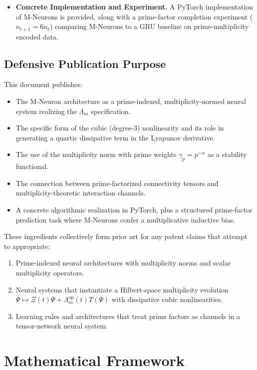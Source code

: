 \documentclass[11pt]{article}
\begin{document}
\begin{itemize}[leftmargin=*]
  \item \textbf{Concrete Implementation and Experiment.}
  A PyTorch implementation of M-Neurons is provided, along with a prime-factor completion experiment (\(n_{t+1}=6n_t\)) comparing M-Neurons to a GRU baseline on prime-multiplicity encoded data.
\end{itemize}

\subsection{Defensive Publication Purpose}

This document publishes:

\begin{itemize}[leftmargin=*]
  \item The M-Neuron architecture as a prime-indexed, multiplicity-normed neural system realizing the \(\Lambda_m\) specification.
  \item The specific form of the cubic (degree-3) nonlinearity and its role in generating a quartic dissipative term in the Lyapunov derivative.
  \item The use of the multiplicity norm with prime weights \(\gamma_p=p^{-\alpha}\) as a stability functional.
  \item The connection between prime-factorized connectivity tensors and multiplicity-theoretic interaction channels.
  \item A concrete algorithmic realization in PyTorch, plus a structured prime-factor prediction task where M-Neurons confer a multiplicative inductive bias.
\end{itemize}

These ingredients collectively form prior art for any patent claims that attempt to appropriate:

\begin{enumerate}[leftmargin=*]
  \item Prime-indexed neural architectures with multiplicity norms and scalar multiplicity operators.
  \item Neural systems that instantiate a Hilbert-space multiplicity evolution \(\Psi \mapsto \Xi(t)\Psi + \Lambda^{\mathrm{op}}_m(t)T(\Psi)\) with dissipative cubic nonlinearities.
  \item Learning rules and architectures that treat prime factors as channels in a tensor-network neural system.
\end{enumerate}

\section{Mathematical Framework}
\end{document}
